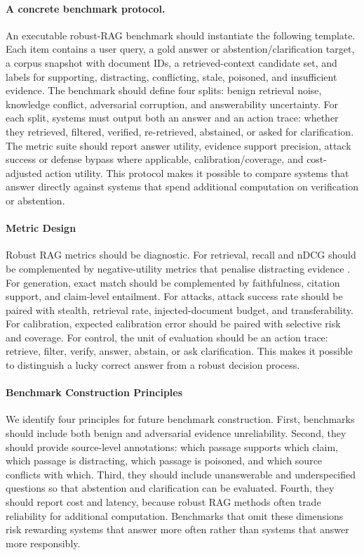 \paragraph{A concrete benchmark protocol.}
An executable robust-RAG benchmark should instantiate the following template. Each item contains a user query, a gold answer or abstention/clarification target, a corpus snapshot with document IDs, a retrieved-context candidate set, and labels for supporting, distracting, conflicting, stale, poisoned, and insufficient evidence. The benchmark should define four splits: benign retrieval noise, knowledge conflict, adversarial corruption, and answerability uncertainty. For each split, systems must output both an answer and an action trace: whether they retrieved, filtered, verified, re-retrieved, abstained, or asked for clarification. The metric suite should report answer utility, evidence support precision, attack success or defense bypass where applicable, calibration/coverage, and cost-adjusted action utility. This protocol makes it possible to compare systems that answer directly against systems that spend additional computation on verification or abstention.

\paragraph{Metric Design}

Robust RAG metrics should be diagnostic. For retrieval, recall and nDCG should be complemented by negative-utility metrics that penalise distracting evidence \citep{rrag058}. For generation, exact match should be complemented by faithfulness, citation support, and claim-level entailment. For attacks, attack success rate should be paired with stealth, retrieval rate, injected-document budget, and transferability. For calibration, expected calibration error should be paired with selective risk and coverage. For control, the unit of evaluation should be an action trace: retrieve, filter, verify, answer, abstain, or ask clarification. This makes it possible to distinguish a lucky correct answer from a robust decision process.

\paragraph{Benchmark Construction Principles}

We identify four principles for future benchmark construction. First, benchmarks should include both benign and adversarial evidence unreliability. Second, they should provide source-level annotations: which passage supports which claim, which passage is distracting, which passage is poisoned, and which source conflicts with which. Third, they should include unanswerable and underspecified questions so that abstention and clarification can be evaluated. Fourth, they should report cost and latency, because robust RAG methods often trade reliability for additional computation. Benchmarks that omit these dimensions risk rewarding systems that answer more often rather than systems that answer more responsibly.
